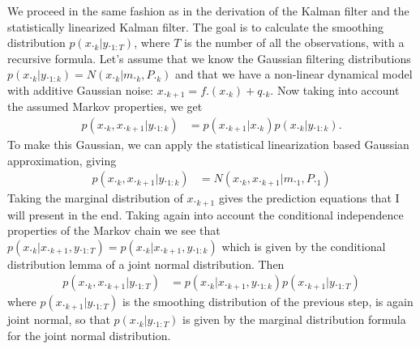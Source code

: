\documentclass[a4paper,oneside,article]{memoir}
\begin{document}
\subsubsection{}\label{sec:7_3a}
We proceed in the same fashion as in the derivation of the Kalman filter and the statistically linearized
Kalman filter. The goal is to calculate the smoothing distribution $p(x._k|y._{1:T})$, where $T$ is the number
of all the observations, with a recursive formula. Let's assume that we know the Gaussian filtering distributions $p(x._k|y._{1:k})=N(x._k|m._k,P._k)$
and that we have a non-linear dynamical model with additive Gaussian noise: $x._{k+1}=f.(x._{k})+q._{k}$. Now taking
into account the assumed Markov properties, we get
\begin{align}
	p(x._k,x._{k+1}|y._{1:k})&=p(x._{k+1}|x._k)p(x._k|y._{1:k}).
\end{align}
To make this Gaussian, we can apply the statistical linearization based Gaussian approximation, giving
\begin{align}
	p(x._k,x._{k+1}|y._{1:k})&=N(x._k,x._{k+1}|m._{1},P._{1})
\end{align}
Taking the marginal distribution of $x._{k+1}$ gives the prediction
equations that I will present in the end. Taking again into account
the conditional independence properties of the Markov chain we see that
$p(x._k|x._{k+1},y._{1:T})=p(x._k|x._{k+1},y._{1:k})$ which is given by the 
conditional distribution lemma of a joint normal distribution. Then
\begin{align}
	p(x._k,x._{k+1}|y._{1:T})&=p(x._k|x._{k+1},y._{1:k})p(x._{k+1}|y._{1:T})
\end{align}
where $p(x._{k+1}|y._{1:T})$ is the smoothing distribution of the previous step,
is again joint normal, so that $p(x._k|y._{1:T})$ is given by the marginal
distribution formula for the joint normal distribution.

 









\subsubsection{}\label{sec:7_3b}
\subsubsection{}\label{sec:7_3c}




%
%
\end{document}

